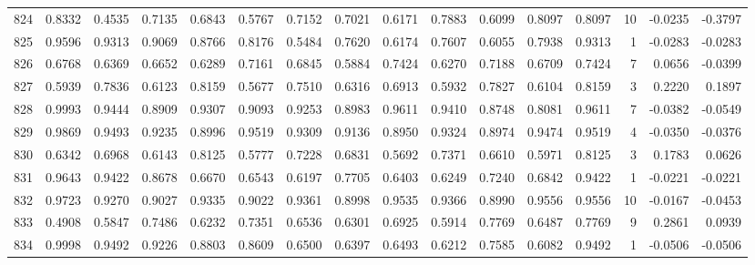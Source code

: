 \begin{tabular}{lrrrrrrrrrrrrrrr}
824 &      0.8332 &  0.4535 &  0.7135 &  0.6843 &  0.5767 &  0.7152 &  0.7021 &  0.6171 &  0.7883 &  0.6099 &   0.8097 &     0.8097 &     10 &                   -0.0235 &                    -0.3797 \\
825 &      0.9596 &  0.9313 &  0.9069 &  0.8766 &  0.8176 &  0.5484 &  0.7620 &  0.6174 &  0.7607 &  0.6055 &   0.7938 &     0.9313 &      1 &                   -0.0283 &                    -0.0283 \\
826 &      0.6768 &  0.6369 &  0.6652 &  0.6289 &  0.7161 &  0.6845 &  0.5884 &  0.7424 &  0.6270 &  0.7188 &   0.6709 &     0.7424 &      7 &                    0.0656 &                    -0.0399 \\
827 &      0.5939 &  0.7836 &  0.6123 &  0.8159 &  0.5677 &  0.7510 &  0.6316 &  0.6913 &  0.5932 &  0.7827 &   0.6104 &     0.8159 &      3 &                    0.2220 &                     0.1897 \\
828 &      0.9993 &  0.9444 &  0.8909 &  0.9307 &  0.9093 &  0.9253 &  0.8983 &  0.9611 &  0.9410 &  0.8748 &   0.8081 &     0.9611 &      7 &                   -0.0382 &                    -0.0549 \\
829 &      0.9869 &  0.9493 &  0.9235 &  0.8996 &  0.9519 &  0.9309 &  0.9136 &  0.8950 &  0.9324 &  0.8974 &   0.9474 &     0.9519 &      4 &                   -0.0350 &                    -0.0376 \\
830 &      0.6342 &  0.6968 &  0.6143 &  0.8125 &  0.5777 &  0.7228 &  0.6831 &  0.5692 &  0.7371 &  0.6610 &   0.5971 &     0.8125 &      3 &                    0.1783 &                     0.0626 \\
831 &      0.9643 &  0.9422 &  0.8678 &  0.6670 &  0.6543 &  0.6197 &  0.7705 &  0.6403 &  0.6249 &  0.7240 &   0.6842 &     0.9422 &      1 &                   -0.0221 &                    -0.0221 \\
832 &      0.9723 &  0.9270 &  0.9027 &  0.9335 &  0.9022 &  0.9361 &  0.8998 &  0.9535 &  0.9366 &  0.8990 &   0.9556 &     0.9556 &     10 &                   -0.0167 &                    -0.0453 \\
833 &      0.4908 &  0.5847 &  0.7486 &  0.6232 &  0.7351 &  0.6536 &  0.6301 &  0.6925 &  0.5914 &  0.7769 &   0.6487 &     0.7769 &      9 &                    0.2861 &                     0.0939 \\
834 &      0.9998 &  0.9492 &  0.9226 &  0.8803 &  0.8609 &  0.6500 &  0.6397 &  0.6493 &  0.6212 &  0.7585 &   0.6082 &     0.9492 &      1 &                   -0.0506 &                    -0.0506 \\

\end{tabular}
